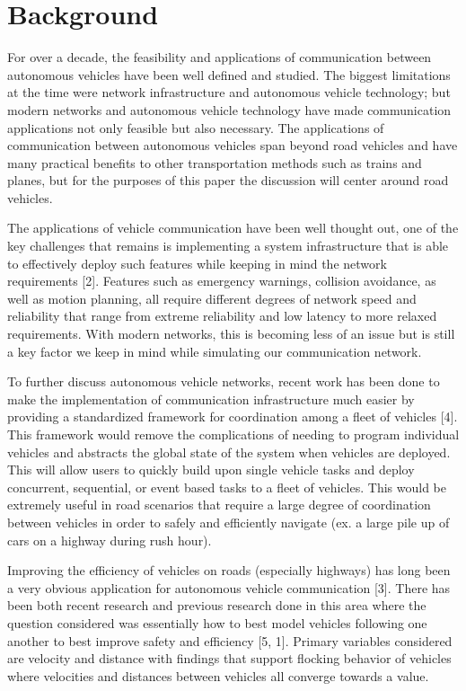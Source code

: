 \section{Background}

For over a decade, the feasibility and applications of communication between autonomous
vehicles have been well defined and studied. The biggest limitations at the time were
network infrastructure and autonomous vehicle technology; but modern networks and
autonomous vehicle technology have made communication applications not only feasible
but also necessary. The applications of communication between autonomous vehicles
span beyond road vehicles and have many practical benefits to other transportation methods
such as trains and planes, but for the purposes of this paper the discussion will center
around road vehicles.

The applications of vehicle communication have been well thought out, one of the key
challenges that remains is implementing a system infrastructure that is able to
effectively deploy such features while keeping in mind the network requirements [2].
Features such as emergency warnings, collision avoidance, as well as motion planning,
all require different degrees of network speed and reliability that range from
extreme reliability and low latency to more relaxed requirements. With modern networks,
this is becoming less of an issue but is still a key factor we keep in mind while
simulating our communication network.

To further discuss autonomous vehicle networks, recent work has been done to make
the implementation of communication infrastructure much easier by providing a standardized
framework for coordination among a fleet of vehicles [4]. This framework would remove
the complications of needing to program individual vehicles and abstracts the global
state of the system when vehicles are deployed. This will allow users to quickly build
upon single vehicle tasks and deploy concurrent, sequential, or event based tasks
to a fleet of vehicles. This would be extremely useful in road scenarios that require
a large degree of coordination between vehicles in order to safely and efficiently
navigate (ex. a large pile up of cars on a highway during rush hour).

Improving the efficiency of vehicles on roads (especially highways) has long been a
very obvious application for autonomous vehicle communication [3]. There has been
both recent research and previous research done in this area where the question
considered was essentially how to best model vehicles following one another to best
improve safety and efficiency [5, 1]. Primary variables considered are velocity
and distance with findings that support flocking behavior of vehicles where velocities
and distances between vehicles all converge towards a value.


